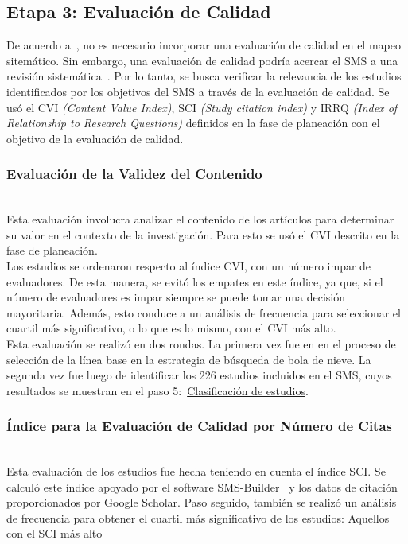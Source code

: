 \subsection{Etapa 3: Evaluación de Calidad}
De acuerdo a~\cite{8747000}, no es necesario incorporar una evaluación de calidad en el mapeo sitemático. Sin embargo, una evaluación de calidad podría acercar el SMS a una revisión sistemática~\cite{10.1145/2601248.2601268}. Por lo tanto, se busca verificar la relevancia de los estudios identificados por los objetivos del SMS a través de la evaluación de calidad. Se usó el CVI \textit{(Content Value Index)}, SCI \textit{(Study citation index)} y IRRQ \textit{(Index of Relationship to Research Questions)} definidos en la fase de planeación con el objetivo de la evaluación de calidad.\\

\subsubsection{Evaluación de la Validez del Contenido}
\mbox{}\\
Esta evaluación involucra analizar el contenido de los artículos para determinar su valor en el contexto de la investigación. Para esto se usó el CVI descrito en la fase de planeación. \\
Los estudios se ordenaron respecto al índice CVI, con un número impar de evaluadores. De esta manera, se evitó los empates en este índice, ya que, si el número de evaluadores es impar siempre se puede tomar una decisión mayoritaria. Además, esto conduce a un análisis de frecuencia para seleccionar el cuartil más significativo, o lo que es lo mismo, con el CVI más alto. \\
Esta evaluación se realizó en dos rondas. La primera vez fue en en el proceso de selección de la línea base en la estrategia de búsqueda de bola de nieve. La segunda vez fue luego de identificar los 226 estudios incluidos en el SMS, cuyos resultados se muestran en el paso 5:~\hyperref[sec:clasificacion-estudios]{Clasificación de estudios}.\\

\subsubsection{Índice para la Evaluación de Calidad por Número de Citas}
\mbox{}\\
Esta evaluación de los estudios fue hecha teniendo en cuenta el índice SCI. Se calculó este índice apoyado por el software SMS-Builder~\cite{candela2020smsbuilder} y los datos de citación proporcionados por Google Scholar. Paso seguido, también se realizó un análisis de frecuencia para obtener el cuartil más significativo de los estudios: Aquellos con el SCI más alto \\

